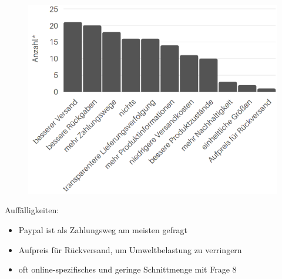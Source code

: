 \begin{figure}[H]
    \begin{center}
        \includegraphics[width=12cm]{media/schuelerumfrage/7.png} 
    \end{center}
\end{figure}
\vfill\vfill
\noindent Auffälligkeiten:
\begin{itemize}
 \item Paypal ist als Zahlungsweg am meisten gefragt
 \item Aufpreis für Rückversand, um Umweltbelastung zu verringern
 \item oft online-spezifisches und geringe Schnittmenge mit Frage 8
 \end{itemize}
\vfill\vfill\vfill\vfill



